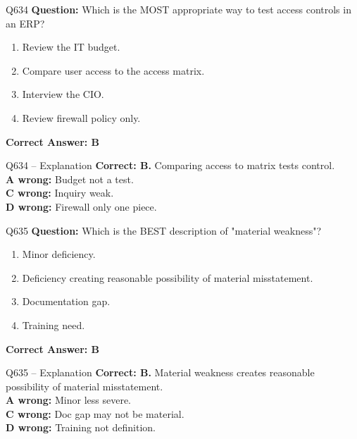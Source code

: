 \documentclass[aspectratio=169,10pt]{beamer}
\begin{document}
	\begin{frame}[t]{Q634}
		\small
		\textbf{Question:} Which is the MOST appropriate way to test access controls in an ERP?
		\begin{enumerate}[label=\Alph*.,itemsep=1pt,topsep=2pt]
			\item Review the IT budget.
			\item Compare user access to the access matrix.
			\item Interview the CIO.
			\item Review firewall policy only.
		\end{enumerate}
		\vspace{4pt}
		\textbf{Correct Answer: B}
	\end{frame}
	
	\begin{frame}[t]{Q634 -- Explanation}
		\small
		\textbf{Correct: B.} Comparing access to matrix tests control. \\[4pt]
		\textbf{A wrong:} Budget not a test. \\[2pt]
		\textbf{C wrong:} Inquiry weak. \\[2pt]
		\textbf{D wrong:} Firewall only one piece.
	\end{frame}
	
	\begin{frame}[t]{Q635}
		\small
		\textbf{Question:} Which is the BEST description of "material weakness"?
		\begin{enumerate}[label=\Alph*.,itemsep=1pt,topsep=2pt]
			\item Minor deficiency.
			\item Deficiency creating reasonable possibility of material misstatement.
			\item Documentation gap.
			\item Training need.
		\end{enumerate}
		\vspace{4pt}
		\textbf{Correct Answer: B}
	\end{frame}
	
	\begin{frame}[t]{Q635 -- Explanation}
		\small
		\textbf{Correct: B.} Material weakness creates reasonable possibility of material misstatement. \\[4pt]
		\textbf{A wrong:} Minor less severe. \\[2pt]
		\textbf{C wrong:} Doc gap may not be material. \\[2pt]
		\textbf{D wrong:} Training not definition.
	\end{frame}
	
\end{document}
